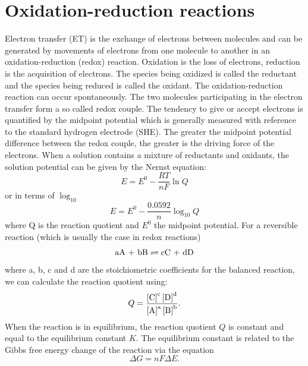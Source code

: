 \documentclass[twoside,single]{lion-msc}
\begin{document}
\section{Oxidation-reduction reactions}
Electron transfer (ET) is the exchange of electrons between molecules and can be generated by movements of electrons from one molecule to another in an oxidation-reduction (redox) reaction. Oxidation is the loss of electrons, reduction is the acquisition of electrons. The species being oxidized is called the reductant and the species being reduced is called the oxidant. The oxidation-reduction reaction can occur spontaneously. The two molecules participating in the electron transfer form a so called redox couple. The tendency to give or accept electrons is quantified by the midpoint potential which is generally measured with reference to the standard hydrogen electrode (SHE). The greater the midpoint potential difference between the redox couple, the greater is the driving force of the electrons. When a solution contains a mixture of reductants and oxidants, the solution potential can be given by the Nernst equation:
\begin{equation} \label{nernst}
E = E^{0} - \frac{RT}{nF} \ln Q
\end{equation}
or in terms of $\log_{10}$
\begin{equation}
E = E^{0} - \frac{0.0592}{n} \log_{10} Q
\end{equation}
where Q is the reaction quotient and $E^{0}$ the midpoint potential. For a reversible reaction (which is usually the case in redox reactions)
\begin{equation}
 \textup{aA + bB}\rightleftharpoons\textup{cC + dD}
\end{equation}
where a, b, c and d are the stoichiometric coefficients for the balanced reaction, we can calculate the reaction quotient using:
\begin{equation}
Q=\frac{\left [\textup{C}  \right ]^{\textup{c}}\left [\textup{D}  \right ]^{\textup{d}}}{\left [\textup{A}  \right ]^{\textup{a}}\left [\textup{B}  \right ]^{\textup{b}}}.
\end{equation}
When the reaction is in equilibrium, the reaction quotient $Q$ is constant and equal to the equilibrium constant $K$. The equilibrium constant is related to the Gibbs free energy change of the reaction via the equation
\begin{equation}
\Delta G =  nF \Delta E .
\end{equation}
\end{document}
